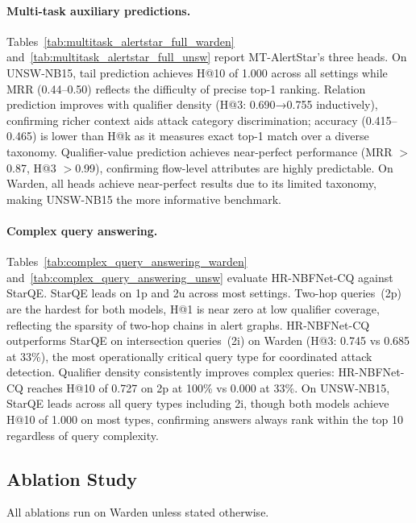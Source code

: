 \documentclass[10pt,journal,compsoc]{IEEEtran}
\begin{document}
\paragraph*{Multi-task auxiliary predictions.}
Tables~\ref{tab:multitask_alertstar_full_warden}
and~\ref{tab:multitask_alertstar_full_unsw} report
MT-AlertStar's three heads. On UNSW-NB15, tail
prediction achieves H@10 of 1.000 across all settings
while MRR (0.44--0.50) reflects the difficulty of
precise top-1 ranking. Relation prediction improves
with qualifier density (H@3: 0.690→0.755 inductively),
confirming richer context aids attack category
discrimination; accuracy (0.415--0.465) is lower
than H@k as it measures exact top-1 match over a
diverse taxonomy. Qualifier-value prediction achieves
near-perfect performance (MRR $>$0.87, H@3 $>$0.99),
confirming flow-level attributes are highly predictable.
On Warden, all heads achieve near-perfect results due
to its limited taxonomy, making UNSW-NB15 the more
informative benchmark.

\paragraph*{Complex query answering.}
Tables~\ref{tab:complex_query_answering_warden}
and~\ref{tab:complex_query_answering_unsw} evaluate
HR-NBFNet-CQ against StarQE. StarQE leads on 1p and
2u across most settings. Two-hop queries~(2p) are the
hardest for both models, H@1 is near zero at low
qualifier coverage, reflecting the sparsity of
two-hop chains in alert graphs. HR-NBFNet-CQ
outperforms StarQE on intersection queries~(2i) on
Warden (H@3: 0.745 vs 0.685 at 33\%), the most
operationally critical query type for coordinated
attack detection. Qualifier density consistently
improves complex queries: HR-NBFNet-CQ reaches H@10
of 0.727 on 2p at 100\% vs 0.000 at 33\%. On
UNSW-NB15, StarQE leads across all query types
including 2i, though both models achieve H@10 of
1.000 on most types, confirming answers always rank
within the top 10 regardless of query complexity.

\subsection{Ablation Study}
\label{ssec:ablation}
All ablations run on Warden unless stated otherwise.
\end{document}
